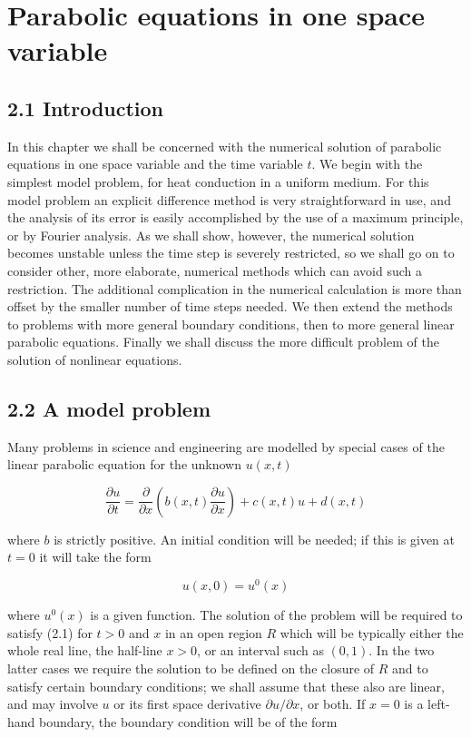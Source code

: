 \documentclass[10pt]{article}
\begin{document}
\section*{Parabolic equations in one space variable}
\subsection*{2.1 Introduction}
In this chapter we shall be concerned with the numerical solution of parabolic equations in one space variable and the time variable \(t\). We begin with the simplest model problem, for heat conduction in a uniform medium. For this model problem an explicit difference method is very straightforward in use, and the analysis of its error is easily accomplished by the use of a maximum principle, or by Fourier analysis. As we shall show, however, the numerical solution becomes unstable unless the time step is severely restricted, so we shall go on to consider other, more elaborate, numerical methods which can avoid such a restriction. The additional complication in the numerical calculation is more than offset by the smaller number of time steps needed. We then extend the methods to problems with more general boundary conditions, then to more general linear parabolic equations. Finally we shall discuss the more difficult problem of the solution of nonlinear equations.

\subsection*{2.2 A model problem}
Many problems in science and engineering are modelled by special cases of the linear parabolic equation for the unknown \(u(x, t)\)

\[
\frac{\partial u}{\partial t}=\frac{\partial}{\partial x}\left(b(x, t) \frac{\partial u}{\partial x}\right)+c(x, t) u+d(x, t)
\]

where \(b\) is strictly positive. An initial condition will be needed; if this is given at \(t=0\) it will take the form

\[
u(x, 0)=u^{0}(x)
\]

where \(u^{0}(x)\) is a given function. The solution of the problem will be required to satisfy (2.1) for \(t>0\) and \(x\) in an open region \(R\) which will be typically either the whole real line, the half-line \(x>0\), or an interval such as \((0,1)\). In the two latter cases we require the solution to be defined on the closure of \(R\) and to satisfy certain boundary conditions; we shall assume that these also are linear, and may involve \(u\) or its first space derivative \(\partial u / \partial x\), or both. If \(x=0\) is a left-hand boundary, the boundary condition will be of the form
\end{document}

